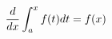 \documentclass[preview]{standalone}
\begin{document}
\begin{align*}
{d \over d x } \int_ {a}^ { x } f( t )d t = f( x )
\end{align*}
\end{document}
